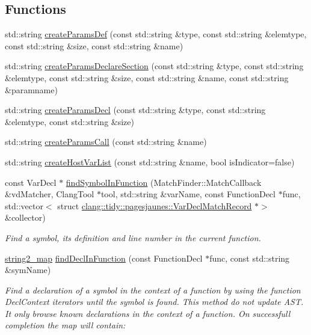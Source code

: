\subsection*{Functions}
\begin{DoxyCompactItemize}
\item 
std\+::string \hyperlink{namespaceclang_1_1tidy_1_1pagesjaunes_a1701f2f2432329ae3bb191dec9a9fa25}{create\+Params\+Def} (const std\+::string \&type, const std\+::string \&elemtype, const std\+::string \&size, const std\+::string \&name)
\item 
std\+::string \hyperlink{namespaceclang_1_1tidy_1_1pagesjaunes_a99da61353138ae9d98e57b2c77bf025c}{create\+Params\+Declare\+Section} (const std\+::string \&type, const std\+::string \&elemtype, const std\+::string \&size, const std\+::string \&name, const std\+::string \&paramname)
\item 
std\+::string \hyperlink{namespaceclang_1_1tidy_1_1pagesjaunes_ac854225e0b2f981f6b0d6f052968fa88}{create\+Params\+Decl} (const std\+::string \&type, const std\+::string \&elemtype, const std\+::string \&size)
\item 
std\+::string \hyperlink{namespaceclang_1_1tidy_1_1pagesjaunes_ae8c5cda28d525b0b8a9cbbc4120275c8}{create\+Params\+Call} (const std\+::string \&name)
\item 
std\+::string \hyperlink{namespaceclang_1_1tidy_1_1pagesjaunes_aec0e9fb404aeca42708f76ae537048c6}{create\+Host\+Var\+List} (const std\+::string \&name, bool is\+Indicator=false)
\item 
const Var\+Decl $\ast$ \hyperlink{namespaceclang_1_1tidy_1_1pagesjaunes_a7fb85380c1d6d7f0778ea98d38abb7ee}{find\+Symbol\+In\+Function} (Match\+Finder\+::\+Match\+Callback \&vd\+Matcher, Clang\+Tool $\ast$tool, std\+::string \&var\+Name, const Function\+Decl $\ast$func, std\+::vector$<$ struct \hyperlink{structclang_1_1tidy_1_1pagesjaunes_1_1_var_decl_match_record}{clang\+::tidy\+::pagesjaunes\+::\+Var\+Decl\+Match\+Record} $\ast$$>$ \&collector)
\begin{DoxyCompactList}\small\item\em Find a symbol, its definition and line number in the current function. \end{DoxyCompactList}\item 
\hyperlink{_exec_s_q_l_common_8h_a68798f7ec86fe00f8e9d5e01773e583b}{string2\+\_\+map} \hyperlink{namespaceclang_1_1tidy_1_1pagesjaunes_a67de085293c9e68c265f89f9159c7b8f}{find\+Decl\+In\+Function} (const Function\+Decl $\ast$func, const std\+::string \&sym\+Name)
\begin{DoxyCompactList}\small\item\em Find a declaration of a symbol in the context of a function by using the function Decl\+Context iterators until the symbol is found. This method do not update A\+ST. It only browse known declarations in the context of a function. On successfull completion the map will contain\+: \end{DoxyCompactList}\item 
$$
\end{DoxyCompactItemize}
